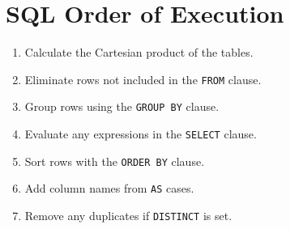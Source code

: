 \section{SQL Order of Execution}\label{sec:sql_order_of_execution}

\begin{enumerate}
    \item Calculate the Cartesian product of the tables.
    \item Eliminate rows not included in the \texttt{FROM} clause.
    \item Group rows using the \texttt{GROUP BY} clause.
    \item Evaluate any expressions in the \texttt{SELECT} clause.
    \item Sort rows with the \texttt{ORDER BY} clause.
    \item Add column names from \texttt{AS} cases.
    \item Remove any duplicates if \texttt{DISTINCT} is set.
\end{enumerate}

